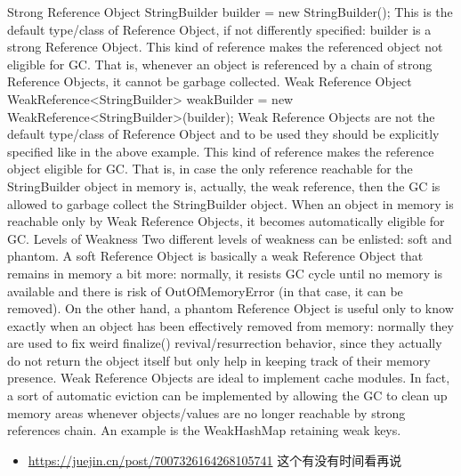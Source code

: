 \documentclass[9pt, b5paper]{article}
\begin{document}
Strong Reference Object
StringBuilder builder = new StringBuilder();
This is the default type/class of Reference Object, if not differently specified: builder is a strong Reference Object. This kind of reference makes the referenced object not eligible for GC. That is, whenever an object is referenced by a chain of strong Reference Objects, it cannot be garbage collected.
Weak Reference Object
WeakReference<StringBuilder> weakBuilder = new WeakReference<StringBuilder>(builder);
Weak Reference Objects are not the default type/class of Reference Object and to be used they should be explicitly specified like in the above example. This kind of reference makes the reference object eligible for GC. That is, in case the only reference reachable for the StringBuilder object in memory is, actually, the weak reference, then the GC is allowed to garbage collect the StringBuilder object. When an object in memory is reachable only by Weak Reference Objects, it becomes automatically eligible for GC.
Levels of Weakness
Two different levels of weakness can be enlisted: soft and phantom.
A soft Reference Object is basically a weak Reference Object that remains in memory a bit more: normally, it resists GC cycle until no memory is available and there is risk of OutOfMemoryError (in that case, it can be removed).
On the other hand, a phantom Reference Object is useful only to know exactly when an object has been effectively removed from memory: normally they are used to fix weird finalize() revival/resurrection behavior, since they actually do not return the object itself but only help in keeping track of their memory presence.
Weak Reference Objects are ideal to implement cache modules. In fact, a sort of automatic eviction can be implemented by allowing the GC to clean up memory areas whenever objects/values are no longer reachable by strong references chain. An example is the WeakHashMap retaining weak keys.
\begin{itemize}
\item \url{https://juejin.cn/post/7007326164268105741} 这个有没有时间看再说
\end{itemize}
\end{document}
